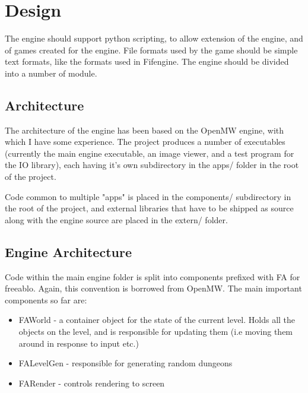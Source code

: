   \chapter{Design}
    The engine should support python scripting, to allow extension of the engine, and of games created for the engine.
    File formats used by the game should be simple text formats, like the formats used in Fifengine.
    The engine should be divided into a number of module.
    
    \section{Architecture}
    The architecture of the engine has been based on the OpenMW\cite{openmw} engine, with which I have some experience.
    The project produces a number of executables (currently the main engine executable, an image viewer, and a test program for the IO library), each having it's own subdirectory in the apps/ folder in the root of the project.
    
    Code common to multiple "apps" is placed in the components/ subdirectory in the root of the project, and external libraries that have to be shipped as source along with the engine source are placed in the extern/ folder.
    
    \section{Engine Architecture}
    Code within the main engine folder is split into components prefixed with FA for freeablo. Again, this convention is borrowed from OpenMW\cite{openmw}.
    The main important components so far are:
    \begin{itemize}
        \item{FAWorld - a container object for the state of the current level. Holds all the objects on the level, and is responsible for updating them (i.e moving them around in response to input etc.)}
        \item{FALevelGen - responsible for generating random dungeons}
        \item{FARender - controls rendering to screen}
    \end{itemize}
